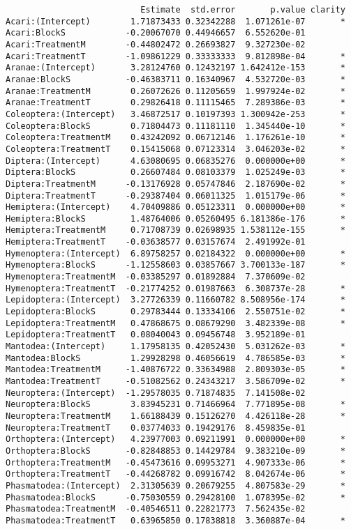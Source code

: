 \documentclass[11pt]{article}
\begin{document}
\begin{verbatim}
                           Estimate  std.error       p.value clarity
Acari:(Intercept)        1.71873433 0.32342288  1.071261e-07       *
Acari:BlockS            -0.20067070 0.44946657  6.552620e-01        
Acari:TreatmentM        -0.44802472 0.26693827  9.327230e-02        
Acari:TreatmentT        -1.09861229 0.33333333  9.812898e-04       *
Aranae:(Intercept)       3.28124760 0.12432197 1.642412e-153       *
Aranae:BlockS           -0.46383711 0.16340967  4.532720e-03       *
Aranae:TreatmentM        0.26072626 0.11205659  1.997924e-02       *
Aranae:TreatmentT        0.29826418 0.11115465  7.289386e-03       *
Coleoptera:(Intercept)   3.46872517 0.10197393 1.300942e-253       *
Coleoptera:BlockS        0.71804473 0.11181110  1.345440e-10       *
Coleoptera:TreatmentM    0.43242092 0.06712146  1.176261e-10       *
Coleoptera:TreatmentT    0.15415068 0.07123314  3.046203e-02       *
Diptera:(Intercept)      4.63080695 0.06835276  0.000000e+00       *
Diptera:BlockS           0.26607484 0.08103379  1.025249e-03       *
Diptera:TreatmentM      -0.13176928 0.05747846  2.187690e-02       *
Diptera:TreatmentT      -0.29387404 0.06011325  1.015179e-06       *
Hemiptera:(Intercept)    4.70409886 0.05123311  0.000000e+00       *
Hemiptera:BlockS         1.48764006 0.05260495 6.181386e-176       *
Hemiptera:TreatmentM     0.71708739 0.02698935 1.538112e-155       *
Hemiptera:TreatmentT    -0.03638577 0.03157674  2.491992e-01        
Hymenoptera:(Intercept)  6.89758257 0.02184322  0.000000e+00       *
Hymenoptera:BlockS      -1.12558603 0.03857667 3.700133e-187       *
Hymenoptera:TreatmentM  -0.03385297 0.01892884  7.370609e-02        
Hymenoptera:TreatmentT  -0.21774252 0.01987663  6.308737e-28       *
Lepidoptera:(Intercept)  3.27726339 0.11660782 8.508956e-174       *
Lepidoptera:BlockS       0.29783444 0.13334106  2.550751e-02       *
Lepidoptera:TreatmentM   0.47868675 0.08679290  3.482339e-08       *
Lepidoptera:TreatmentT   0.08040043 0.09456748  3.952189e-01        
Mantodea:(Intercept)     1.17958135 0.42052430  5.031262e-03       *
Mantodea:BlockS          1.29928298 0.46056619  4.786585e-03       *
Mantodea:TreatmentM     -1.40876722 0.33634988  2.809303e-05       *
Mantodea:TreatmentT     -0.51082562 0.24343217  3.586709e-02       *
Neuroptera:(Intercept)  -1.29578035 0.71874835  7.141508e-02        
Neuroptera:BlockS        3.83945231 0.71466964  7.771895e-08       *
Neuroptera:TreatmentM    1.66188439 0.15126270  4.426118e-28       *
Neuroptera:TreatmentT    0.03774033 0.19429176  8.459835e-01        
Orthoptera:(Intercept)   4.23977003 0.09211991  0.000000e+00       *
Orthoptera:BlockS       -0.82848853 0.14429784  9.383210e-09       *
Orthoptera:TreatmentM   -0.45473616 0.09953271  4.907333e-06       *
Orthoptera:TreatmentT   -0.44268782 0.09916742  8.042674e-06       *
Phasmatodea:(Intercept)  2.31305639 0.20679255  4.807583e-29       *
Phasmatodea:BlockS      -0.75030559 0.29428100  1.078395e-02       *
Phasmatodea:TreatmentM  -0.40546511 0.22821773  7.562435e-02        
Phasmatodea:TreatmentT   0.63965850 0.17838818  3.360887e-04       *
\end{verbatim}
\end{document}
